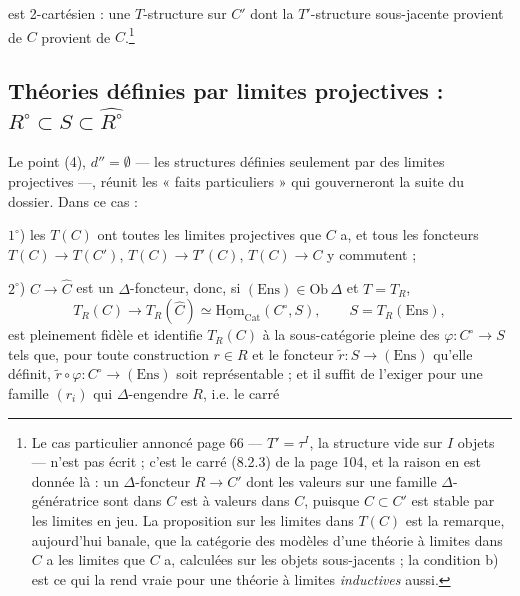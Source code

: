 \documentclass[11pt,a4paper]{article}
\begin{document}

est 2-cartésien : une $T$-structure sur $C'$ dont la $T'$-structure
sous-jacente provient de $C$ provient de $C$.\footnote{Le cas
particulier annoncé page 66 — $T' = \tau^{I}$, la structure vide sur $I$
objets — n'est pas écrit ; c'est le carré (8.2.3) de la page 104, et la
raison en est donnée là : un $\Delta$-foncteur $R \to C'$ dont les valeurs
sur une famille $\Delta$-génératrice sont dans $C$ est à valeurs dans $C$,
puisque $C \subset C'$ est stable par les limites en jeu. La proposition
sur les limites dans $T(C)$ est la remarque, aujourd'hui banale, que la
catégorie des modèles d'une théorie à limites dans $C$ a les limites que
$C$ a, calculées sur les objets sous-jacents ; la condition b) est ce qui
la rend vraie pour une théorie à limites \emph{inductives} aussi.}

\subsection*{Théories définies par limites projectives : $R^{\circ} \subset S \subset \widehat{R^{\circ}}$}

Le point (4), $d'' = \emptyset$ — les structures définies seulement par des
limites projectives —, réunit les « faits particuliers » qui gouverneront
la suite du dossier. Dans ce cas :

$1^{\circ}$) les $T(C)$ ont toutes les limites projectives que $C$ a, et
tous les foncteurs $T(C) \to T(C')$, $T(C) \to T'(C)$, $T(C) \to C$ y
commutent ;

$2^{\circ}$) $C \to \widehat{C}$ est un $\Delta$-foncteur, donc, si
$(\mathrm{Ens}) \in \mathrm{Ob}\,\Delta$ et $T = T_{R}$,
\[
T_{R}(C) \longrightarrow T_{R}(\widehat{C}) \simeq
\underline{\mathrm{Hom}}_{\mathrm{Cat}}(C^{\circ}, S), \qquad S = T_{R}(\mathrm{Ens}),
\]
est pleinement fidèle et identifie $T_{R}(C)$ à la sous-catégorie pleine
des $\varphi : C^{\circ} \to S$ tels que, pour toute construction $r \in R$
et le foncteur $\tilde{r} : S \to (\mathrm{Ens})$ qu'elle définit, $\tilde{r}
\circ \varphi : C^{\circ} \to (\mathrm{Ens})$ soit représentable ; et il
suffit de l'exiger pour une famille $(r_{i})$ qui $\Delta$-engendre $R$,
i.e. le carré

\end{document}

